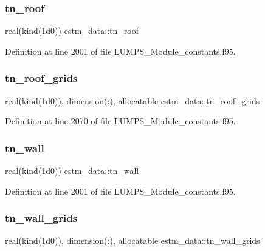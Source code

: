 \subsubsection{\texorpdfstring{tn\+\_\+roof}{tn\_roof}}
{\footnotesize\ttfamily real(kind(1d0)) estm\+\_\+data\+::tn\+\_\+roof}



Definition at line 2001 of file L\+U\+M\+P\+S\+\_\+\+Module\+\_\+constants.\+f95.

\mbox{\label{namespaceestm__data_acf62443d4b1f09aedd9a2a08c8a1d3b1}} 
\subsubsection{\texorpdfstring{tn\+\_\+roof\+\_\+grids}{tn\_roof\_grids}}
{\footnotesize\ttfamily real(kind(1d0)), dimension(\+:), allocatable estm\+\_\+data\+::tn\+\_\+roof\+\_\+grids}



Definition at line 2070 of file L\+U\+M\+P\+S\+\_\+\+Module\+\_\+constants.\+f95.

\mbox{\label{namespaceestm__data_a5a5ae17df9fbcfc4b4d7ce3510cff799}} 
\subsubsection{\texorpdfstring{tn\+\_\+wall}{tn\_wall}}
{\footnotesize\ttfamily real(kind(1d0)) estm\+\_\+data\+::tn\+\_\+wall}



Definition at line 2001 of file L\+U\+M\+P\+S\+\_\+\+Module\+\_\+constants.\+f95.

\mbox{\label{namespaceestm__data_a5aa42393956ede1855e258e1943f27a2}} 
\subsubsection{\texorpdfstring{tn\+\_\+wall\+\_\+grids}{tn\_wall\_grids}}
{\footnotesize\ttfamily real(kind(1d0)), dimension(\+:), allocatable estm\+\_\+data\+::tn\+\_\+wall\+\_\+grids}



